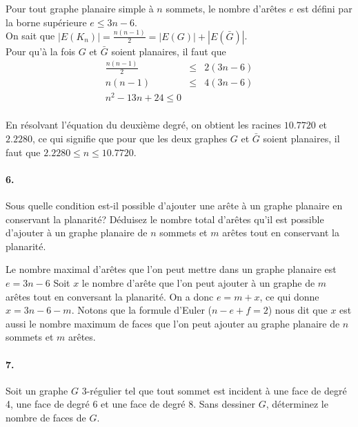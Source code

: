 \begin{solution} Pour tout graphe planaire simple à $n$ sommets, le nombre d'arêtes $e$ est défini par la borne supérieure  $e \leq 3n - 6$. \\
On sait que $|E(K_{n})| = \frac{n(n-1)}{2} = |E(G)| + |E(\bar{G})|$. \\
Pour qu'à la fois $G$ et $\bar{G}$ soient planaires, il faut que 
\[ \begin{array}{rcl}
 \frac{n(n-1)}{2} &\leq& 2 (3n - 6) \\
  n(n-1) &\leq& 4(3n - 6) \\
  n^2 - 13n + 24 \leq 0 \\
 \end{array} \]
 
 En résolvant l'équation du deuxième degré, on obtient les racines $10.7720$ et $2.2280$, ce qui signifie que pour que les deux graphes $G$ et $\bar{G}$ soient planaires, il faut que $2.2280 \leq n \leq 10.7720$.
 \end{solution}

\paragraph{6. } Sous quelle condition est-il possible d’ajouter une arête à un graphe planaire en conservant la planarité? Déduisez le nombre total d’arêtes qu’il est possible d’ajouter à un graphe planaire de $n$ sommets et $m$ arêtes tout en conservant la planarité.

\begin{solution} Le nombre maximal d'arêtes que l'on peut mettre dans un graphe planaire est $e = 3n - 6$ Soit $x$ le nombre d'arête que l'on peut ajouter à un graphe de $m$ arêtes tout en conversant la planarité. On a donc $e = m + x$, ce qui donne $x = 3n - 6 - m$. Notons que la formule d'Euler ($ n - e + f = 2$) nous dit que $x$ est aussi le nombre maximum de faces que l'on peut ajouter au graphe planaire de $n$ sommets et $m$ arêtes. 
\end{solution}

\paragraph{7. } Soit un graphe $G$ 3-régulier tel que tout sommet est incident à une face de degré 4, une face de degré 6 et une face de degré 8. Sans dessiner $G$, déterminez le nombre de faces de $G$.

